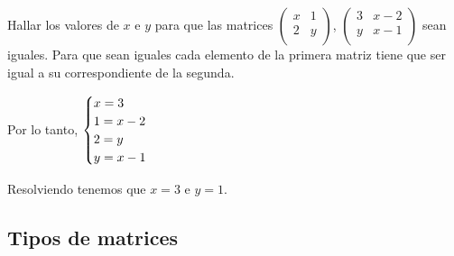 \begin{ejemplo}
Hallar los valores de $x$ e $y$ para que las matrices $ \begin{pmatrix}  x & 1 \\  2 & y \\ \end{pmatrix}$, $ \begin{pmatrix}  3 & x-2 \\  y & x-1 \\ \end{pmatrix}$ sean iguales.
\tcblower
Para que sean iguales cada elemento de la primera matriz tiene que ser igual a su correspondiente de la segunda.

Por lo tanto, $\begin{cases} x= 3 \cr 1= x-2 \cr 2= y \cr y=x-1 \end{cases}$
 
Resolviendo tenemos que $x=3 $ e $ y=1$.
\end{ejemplo}

\subsection{Tipos de matrices}

